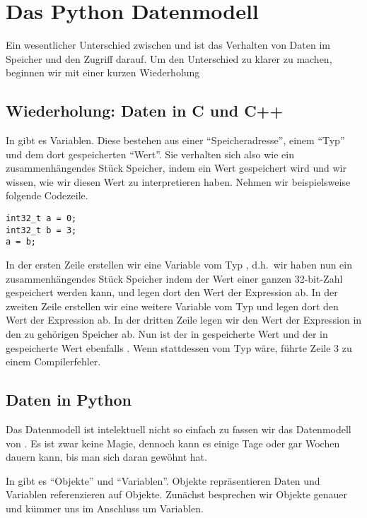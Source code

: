 \section{Das Python Datenmodell}
\label{section:datamodel}
Ein wesentlicher Unterschied zwischen \CC und \Python ist das Verhalten von Daten im Speicher und den Zugriff darauf.
Um den Unterschied zu \CC klarer zu machen, beginnen wir mit einer kurzen Wiederholung


\subsection{Wiederholung: Daten in C und C++}
\label{section:datamodel:cc}
In \CC gibt es Variablen.
Diese bestehen aus einer ``Speicheradresse'', einem ``Typ'' und dem dort gespeicherten ``Wert''.
Sie verhalten sich also wie ein zusammenhängendes Stück Speicher, indem ein Wert gespeichert wird und wir wissen, wie wir diesen Wert zu interpretieren haben.
Nehmen wir beispielsweise folgende Codezeile.
\begin{lstlisting}[style=CPP]
int32_t a = 0;
int32_t b = 3;
a = b;
\end{lstlisting}
In der ersten Zeile erstellen wir eine Variable vom Typ , d.h.\ wir haben nun ein zusammenhängendes Stück Speicher indem der Wert einer ganzen 32-bit-Zahl gespeichert werden kann,
und legen dort den Wert der Expression  ab.
In der zweiten Zeile erstellen wir eine weitere Variable vom Typ  und legen dort den Wert der Expression  ab.
In der dritten Zeile legen wir den Wert der Expression  in den zu  gehörigen Speicher ab.
Nun ist der in  gespeicherte Wert  und der in  gespeicherte Wert ebenfalls .
Wenn  stattdessen vom Typ  wäre, führte Zeile 3 zu einem Compilerfehler.


\subsection{Daten in Python}
\label{section:datamodel:python}
Das \Python Datenmodell ist intelektuell nicht so einfach zu fassen wir das Datenmodell von \CC.
Es ist zwar keine Magie, dennoch kann es einige Tage oder gar Wochen dauern kann, bis man sich daran gewöhnt hat.

In \Python gibt es ``Objekte'' und ``Variablen''.
Objekte repräsentieren Daten und Variablen referenzieren auf Objekte.
Zunächst besprechen wir Objekte genauer und kümmer uns im Anschluss um Variablen.


